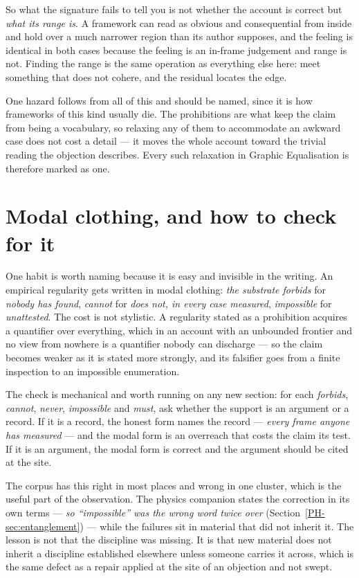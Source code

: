 \documentclass[11pt,a4paper]{article}
\begin{document}
So what the signature fails to tell you is not whether the account is correct but \emph{what its range
is}. A framework can read as obvious and consequential from inside and hold over a much narrower region
than its author supposes, and the feeling is identical in both cases because the feeling is an in-frame
judgement and range is not. Finding the range is the same operation as everything else here: meet
something that does not cohere, and the residual locates the edge.

One hazard follows from all of this and should be named, since it is how frameworks of this kind
usually die. The prohibitions are what keep the claim from being a vocabulary, so relaxing any of them
to accommodate an awkward case does not cost a detail --- it moves the whole account toward the trivial
reading the objection describes. Every such relaxation in Graphic Equalisation is therefore marked as one.

\section{Modal clothing, and how to check for it}\label{sec:modal}
One habit is worth naming because it is easy and invisible in the writing. An empirical regularity
gets written in modal clothing: \emph{the substrate
forbids} for \emph{nobody has found}, \emph{cannot} for \emph{does not, in every case measured},
\emph{impossible} for \emph{unattested}. The cost is not stylistic. A regularity stated as a
prohibition acquires a quantifier over everything, which in an account with an unbounded frontier and
no view from nowhere is a quantifier nobody can discharge --- so the claim becomes weaker as it is
stated more strongly, and its falsifier goes from a finite inspection to an impossible enumeration.

The check is mechanical and worth running on any new section: for each \emph{forbids}, \emph{cannot},
\emph{never}, \emph{impossible} and \emph{must}, ask whether the support is an argument or a record. If
it is a record, the honest form names the record --- \emph{every frame anyone has measured} --- and the
modal form is an overreach that costs the claim its test. If it is an argument, the modal form is
correct and the argument should be cited at the site.

The corpus has this right in most places and wrong in one cluster, which is the useful part of the
observation. The physics companion states the correction in its own terms --- \emph{so ``impossible''
was the wrong word twice over} (Section~\ref{PH-sec:entanglement}) --- while the failures sit in
material that did not inherit it. The lesson is not that the discipline was missing. It is
that new material does not inherit a discipline established elsewhere unless someone carries it across,
which is the same defect as a repair applied at the site of an objection and not swept.
\end{document}

